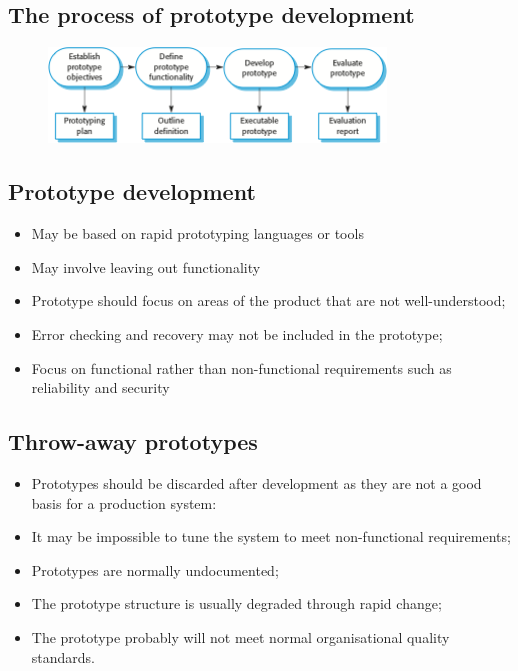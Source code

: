 \subsection{The process of prototype development}
\begin{figure}[h!]
    \centering
    \includegraphics[width = 0.8\textwidth]{./figures/prototype_L1_9.png}
    \caption{}
    \label{fig:L1_9}
\end{figure}


\subsection{Prototype development}
\begin{itemize}
\item May be based on rapid prototyping languages or tools
\item May involve leaving out functionality
\item Prototype should focus on areas of the product that are not well-understood;
\item Error checking and recovery may not be included in the prototype;
\item Focus on functional rather than non-functional requirements such as reliability and security
\end{itemize}

\subsection{Throw-away prototypes}
\begin{itemize}
\item Prototypes should be discarded after development as they are not a good basis for a production system:

\item It may be impossible to tune the system to meet non-functional requirements;
\item Prototypes are normally undocumented;

\item The prototype structure is usually degraded through rapid change;
\item The prototype probably will not meet normal organisational quality standards.
\end{itemize}


